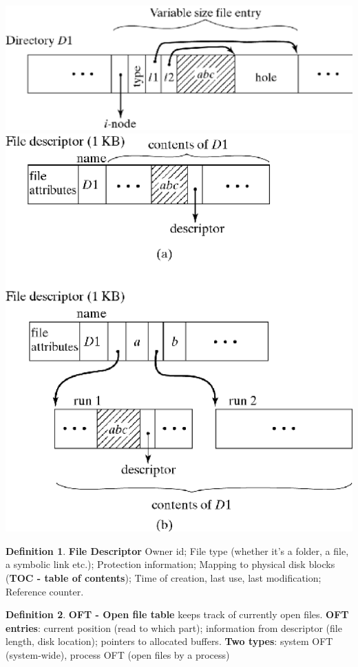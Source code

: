 \documentclass[11pt,a4paper]{article}
\theoremstyle{definition}
\newtheorem{definition}{Definition}[section]
\begin{document}
	\begin{minipage}{0.5\linewidth}
		\includegraphics[width=0.8\linewidth ]{m2/implementDirectory}
		\includegraphics[width=0.8\linewidth ]{m2/entryOrganization}
	\end{minipage}
	
\begin{definition}{\textbf{File Descriptor}}
	Owner id; File type (whether it's a folder, a file, a symbolic link etc.); Protection information; Mapping to physical disk blocks (\textbf{TOC - table of contents}); Time of creation, last use, last modification; Reference counter.
\end{definition}

\begin{definition}{\textbf{OFT - Open file table}}
	keeps track of currently open files. \textbf{OFT entries}: current position (read to which part); information from descriptor (file length, disk location); pointers to allocated buffers. \textbf{Two types}: system OFT (system-wide), process OFT (open files by a process)
\end{definition}
\end{document}
